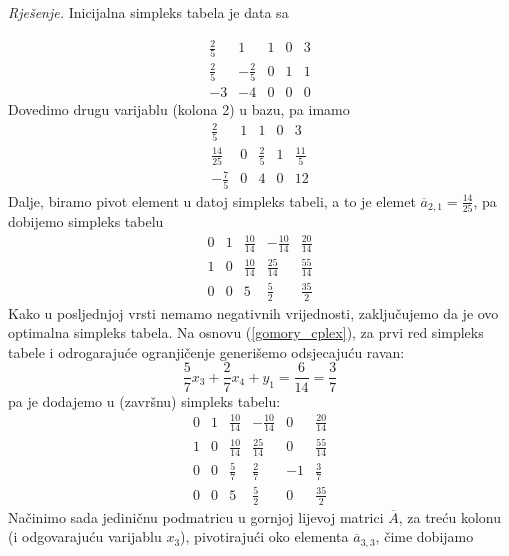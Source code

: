\documentclass[a4paper, utf8, 11pt, colorlinks]{article}
\begin{document}
\emph{Rješenje.}
Inicijalna simpleks tabela je data sa 

$$\begin{array}{cccc|c}
   \frac{2}{5}           & 1               & 1 & 0 & 3 \\
   \frac{2}{5}           & -\frac{2}{5}    & 0 & 1 & 1 \\ \hline
   -3                    &  -4             & 0 & 0 & 0
\end{array}$$
Dovedimo drugu varijablu (kolona 2) u bazu, pa imamo 
$$\begin{array}{cccc|c}
   \frac{2}{5}           & 1               & 1           & 0 & 3 \\
   \frac{14}{25}         & 0               & \frac{2}{5} & 1 & \frac{11}{5}\\ \hline
   -\frac{7}{5}                  & 0               &4 & 0 & 12
\end{array}$$
Dalje, biramo pivot element u datoj simpleks tabeli, a to je elemet $\overline{a}_{2,1} = \frac{14}{25}$, pa dobijemo simpleks tabelu
$$
\begin{array}{cccc|c}
    0    &  1  &  \frac{10}{14} &  -\frac{10}{14}  &  \frac{20}{14}                  \\
    1    &  0  &  \frac{10}{14} &   \frac{25}{14}  &   \frac{55}{14}\\ \hline
    0    &  0  &  5             &    \frac{5}{2}   &    \frac{35}{2}
\end{array}
$$
Kako u posljednjoj vrsti nemamo negativnih vrijednosti, zaključujemo da je ovo optimalna simpleks tabela. Na osnovu (\ref{gomory_cplex}),   za prvi red simpleks tabele i odrogarajuće ogranjičenje generišemo odsjecajuću ravan:
$$   \frac{5}{7}x_3 + \frac{2}{7} x_4 +      y_1   = \frac{6}{14}=\frac{3}{7}$$
pa je dodajemo u (završnu) simpleks tabelu:
$$
\begin{array}{ccccc|c}
    0    &  1  &  \frac{10}{14} &  -\frac{10}{14}  &  0 & \frac{20}{14}                  \\
    1    &  0  &  \frac{10}{14} &   \frac{25}{14}  &  0 & \frac{55}{14}\\ 
    0    &  0  & \frac{5}{7}    &   \frac{2}{7}    &  -1 & \frac{3}{7}  \\
     \hline 
    0    &  0  &  5             &    \frac{5}{2}   &  0 &    \frac{35}{2}
\end{array}
$$
Načinimo sada jediničnu podmatricu u gornjoj lijevoj matrici $\overline{A}$, za treću kolonu (i odgovarajuću varijablu $x_3$), pivotirajući oko elementa $\overline{a}_{3,3}$, čime dobijamo 
\end{document}
